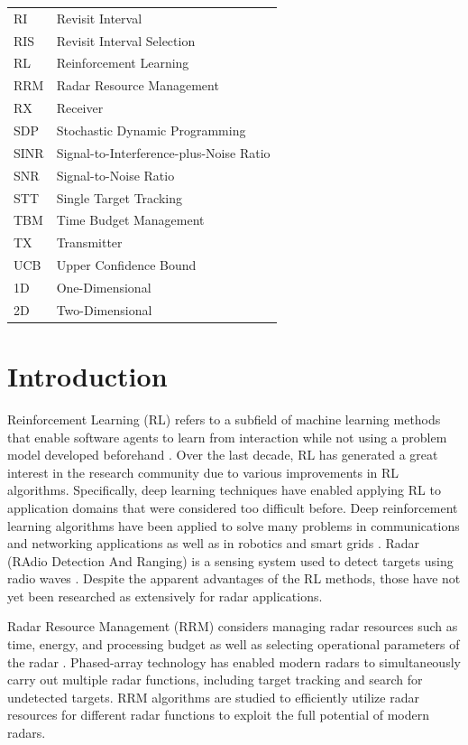 \documentclass[english, 12pt, a4paper, elec, utf8, a-1b, online]{aaltothesis}
\numberwithin{equation}{section}
\begin{document}
\begin{tabular}{ll}
RI  & Revisit Interval \\
RIS & Revisit Interval Selection \\
RL & Reinforcement Learning \\
RRM & Radar Resource Management \\
RX & Receiver \\
SDP  & Stochastic Dynamic Programming \\
SINR  & Signal-to-Interference-plus-Noise Ratio \\
SNR & Signal-to-Noise Ratio \\
STT & Single Target Tracking \\
TBM & Time Budget Management \\
TX & Transmitter \\
UCB & Upper Confidence Bound \\
1D & One-Dimensional \\
2D & Two-Dimensional \\
\end{tabular}


\cleardoublepage
{}
\section{Introduction}
\setcounter{page}{1}

Reinforcement Learning (RL) refers to a subfield of machine learning methods that enable software agents to learn from interaction while not using a problem model developed beforehand \cite{Sutton2018}. 
Over the last decade, RL has generated a great interest in the research community due to various improvements in RL algorithms.
Specifically, deep learning techniques have enabled applying RL to application domains that were considered too difficult before. 
Deep reinforcement learning algorithms have been applied to solve many problems in communications and networking applications \cite{Luong2018} as well as in robotics \cite{Kober2013} and smart grids \cite{Zhang2018}.
Radar (RAdio Detection And Ranging) is a sensing system used to detect targets using radio waves \cite{Curry2011}.
Despite the apparent advantages of the RL methods, those have not yet been researched as extensively for radar applications.


Radar Resource Management (RRM) considers managing radar resources such as time, energy, and processing budget as well as selecting operational parameters of the radar \cite{Moo2016}.
Phased-array technology has enabled modern radars to simultaneously carry out multiple radar functions, including target tracking and search for undetected targets.
RRM algorithms are studied to efficiently utilize radar resources for different radar functions to exploit the full potential of modern radars.
\end{document}
